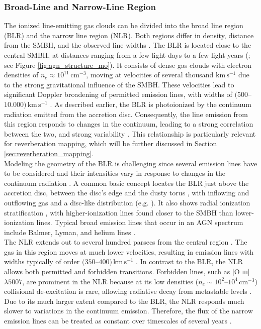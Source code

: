 \subsubsection{Broad-Line and Narrow-Line Region}
\label{sec:BLRNLR}

The ionized line-emitting gas clouds can be divided into the broad line region (BLR) and the narrow line region (NLR). Both regions differ in density, distance from the SMBH, and the observed line widths \parencite{urry1995unified}. The BLR is located close to the central SMBH, at distances ranging from a few light-days to a few light-years (\cite{goadBroadLine}; see Figure \ref{fig:agn_structure_mo}). It consists of dense gas clouds with electron densities of $n_e \approx 10^{11}\,\mathrm{cm^{-3}}$, moving at velocities of several thousand $\mathrm{km\,s^{-1}}$ due to the strong gravitational influence of the SMBH. These velocities lead to significant Doppler broadening of permitted emission lines, with widths of $(500$–$10.000)\,\mathrm{km\,s^{-1}}$ \parencite{peterson1997introduction}.
As described earlier, the BLR is photoionized by the continuum radiation emitted from the accretion disc. Consequently, the line emission from this region responds to changes in the continuum, leading to a strong correlation between the two, and strong variability \parencite{peterson1997introduction}. This relationship is particularly relevant for reverberation mapping, which will be further discussed in Section \ref{sec:reverberation_mapping}.\\ Modeling the geometry of the BLR is challenging since several emission lines have to be considered and their intensities vary in response to changes in the continuum radiation \parencite{netzer2013agn}. A common basic concept locates the BLR just above the accretion disc, between the disc’s edge and the dusty torus \parencite{gaskell2009broad, goadBroadLine}, with inflowing and outflowing gas \parencite{czerny2011origin} and a disc-like distribution (e.g. \cite{Williams_2018}). It also shows radial ionization stratification \parencite{collin1988broad, gaskell1986line, kollatschny2001short}, with higher-ionization lines found closer to the SMBH than lower-ionization lines. Typical broad emission lines that occur in an AGN spectrum include Balmer, Lyman, and helium lines \parencite{netzer2013agn}.
\\
The NLR extends out to several hundred parsecs from the central region \parencite{peterson1997introduction}. The gas in this region moves at much lower velocities, resulting in emission lines with widths typically of order $(350$--$400)\,\mathrm{km\,s^{-1}}$ \parencite{peterson1997introduction}. In contrast to the BLR, the NLR allows both permitted and forbidden transitions. Forbidden lines, such as [O \textsc{iii}] $\lambda5007$, are prominent in the NLR because at its low densities ($n_e \sim 10^2$–$10^4\,\mathrm{cm^{-3}}$) collisional de-excitation is rare, allowing radiative decay from metastable levels \parencite{peterson1997introduction}. Due to its much larger extent compared to the BLR, the NLR responds much slower to variations in the continuum emission. Therefore, the flux of the narrow emission lines can be treated as constant over timescales of several years \parencite{peterson1997introduction}.\\
